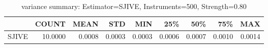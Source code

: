 \begin{table}[ht]
\centering
\caption{variance summary: Estimator=SJIVE, Instruments=500, Strength=0.80}
\begin{tabular}{lrrrrrrrr}
\toprule
 & COUNT & MEAN & STD & MIN & 25\% & 50\% & 75\% & MAX \\
\midrule
SJIVE & 10.0000 & 0.0008 & 0.0003 & 0.0003 & 0.0006 & 0.0007 & 0.0010 & 0.0014 \\
\bottomrule
\end{tabular}
\end{table}
